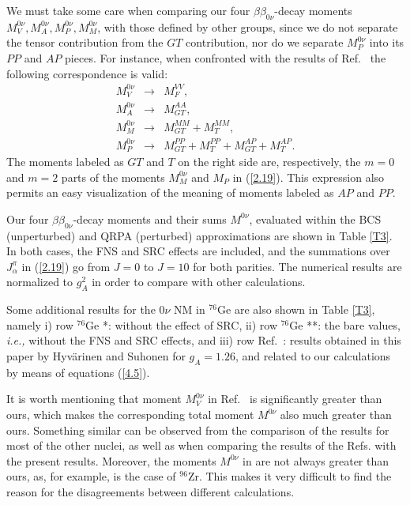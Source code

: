 \documentclass[nofootinbib,twocolumn,eqsecnum,floats,aps]{revtex4}
\def\sss{\scriptscriptstyle}
\def\nn{\nonumber }
\def\ie{{\it i.e., }}
\def\nn{\nonumber }
\def\br{\begin{eqnarray}}
\def\er{\end{eqnarray}}
\def\rf#1{{(\ref{#1})}}
\def\go{\rightarrow  }
\def\a {{\alpha}}
\def\b {{\beta}}
\def\sss{\scriptscriptstyle}
\begin{document}
{We must take some care when comparing our four $\b\b_{0\nu}$-decay moments
$M^{0\nu}_V,M^{0\nu}_A,M^{0\nu}_P,M^{0\nu}_{M}$, with those defined by other groups,
since we do not separate the tensor contribution from the $GT$ contribution, nor do
we separate $M^{0\nu}_P$ into its  $PP$ and $AP$ pieces. For instance,
when confronted with the results of Ref.~\cite{Hyv15} the following correspondence
is valid:
\br
M^{0\nu}_V&\go& M_F^{VV},
\nn\\
M^{0\nu}_A&\go& M_{GT}^{AA},
\nn\\
M^{0\nu}_M&\go& M_{GT}^{MM}+M_{T}^{MM},
\nn\\
M^{0\nu}_P&\go& M_{GT}^{PP}+M_{T}^{PP}+M_{GT}^{AP}+M_{T}^{AP}.
\label{4.5}\er
The moments labeled as $GT$ and $T$ on the right side are,
respectively, the $m=0$ and $m=2$ parts of the moments  $M^{0\nu}_M$
and $M_{P}$ in \rf{2.19}.  This expression also
permits an easy visualization of the meaning of moments labeled as $AP$ and $PP$.

Our four $\b\b_{0\nu}$-decay moments and  their
sums $M^{0\nu} $,
evaluated within the BCS (unperturbed) and QRPA (perturbed) approximations
are shown in Table \ref{T3}.
In  both cases, the FNS  and SRC effects are included,
and the summations over $J^\pi_{\a} $ in \rf{2.19} go
from $J=0$  to $J=10$ for both parities.
The numerical results  are normalized to $g_{\sss A}^2$ in order
to compare  with other calculations.

Some additional results for the $0\nu$ NM in $^{76}$Ge are also shown in Table \ref{T3}, namely
i) row  $^{76}$Ge *:  without the effect of SRC,
ii) row  $^{76}$Ge **: the bare values, \ie without the
FNS and SRC effects,  and  iii) row Ref.~\cite{Hyv15}:  results obtained in this paper  by  Hyv\"arinen and  Suhonen
for $g_{\sss A}=1.26$, and related
to our calculations by means of equations \rf{4.5}.
%

It is worth mentioning that moment $M^{0\nu}_V$  in Ref.~\cite{Hyv15} is significantly greater than ours, which
 makes the corresponding total moment $M^{0\nu}$ also much greater than ours.
Something similar can be observed from the comparison of the results for most
of the other nuclei, as well as when comparing the results of the
Refs. \cite{Sim13,Don15} with  the present results.
Moreover, the moments  $M^{0\nu}$ in  \cite{Hyv15} are not always greater
than ours, as, for example, is the case of  $^{96}$Zr. This makes it very difficult
to find the reason for the disagreements between different calculations.%


}
\end{document}
